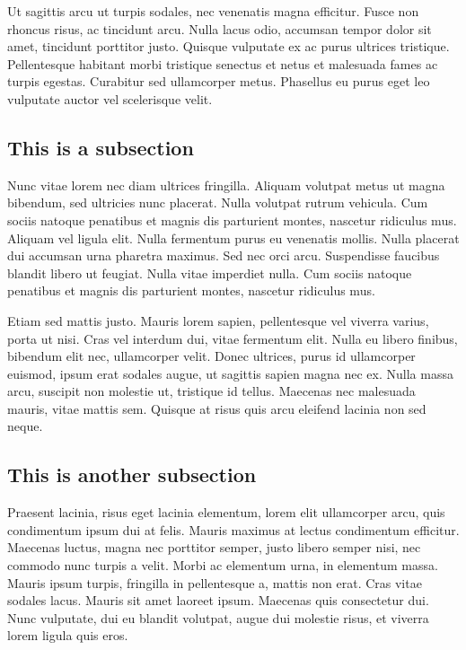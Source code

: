 \documentclass{acmsiggraph} %
\begin{document}
Ut sagittis arcu ut turpis sodales, nec venenatis magna efficitur. Fusce non rhoncus risus, ac tincidunt arcu. Nulla lacus odio, accumsan tempor dolor sit amet, tincidunt porttitor justo. Quisque vulputate ex ac purus ultrices tristique. Pellentesque habitant morbi tristique senectus et netus et malesuada fames ac turpis egestas. Curabitur sed ullamcorper metus. Phasellus eu purus eget leo vulputate auctor vel scelerisque velit.

\subsection{This is a subsection}

Nunc vitae lorem nec diam ultrices fringilla. Aliquam volutpat metus ut magna bibendum, sed ultricies nunc placerat. Nulla volutpat rutrum vehicula. Cum sociis natoque penatibus et magnis dis parturient montes, nascetur ridiculus mus. Aliquam vel ligula elit. Nulla fermentum purus eu venenatis mollis. Nulla placerat dui accumsan urna pharetra maximus. Sed nec orci arcu. Suspendisse faucibus blandit libero ut feugiat. Nulla vitae imperdiet nulla. Cum sociis natoque penatibus et magnis dis parturient montes, nascetur ridiculus mus.

Etiam sed mattis justo. Mauris lorem sapien, pellentesque vel viverra varius, porta ut nisi. Cras vel interdum dui, vitae fermentum elit. Nulla eu libero finibus, bibendum elit nec, ullamcorper velit. Donec ultrices, purus id ullamcorper euismod, ipsum erat sodales augue, ut sagittis sapien magna nec ex. Nulla massa arcu, suscipit non molestie ut, tristique id tellus. Maecenas nec malesuada mauris, vitae mattis sem. Quisque at risus quis arcu eleifend lacinia non sed neque.

\subsection{This is another subsection}

Praesent lacinia, risus eget lacinia elementum, lorem elit ullamcorper arcu, quis condimentum ipsum dui at felis. Mauris maximus at lectus condimentum efficitur. Maecenas luctus, magna nec porttitor semper, justo libero semper nisi, nec commodo nunc turpis a velit. Morbi ac elementum urna, in elementum massa. Mauris ipsum turpis, fringilla in pellentesque a, mattis non erat. Cras vitae sodales lacus. Mauris sit amet laoreet ipsum. Maecenas quis consectetur dui. Nunc vulputate, dui eu blandit volutpat, augue dui molestie risus, et viverra lorem ligula quis eros.
\end{document}
